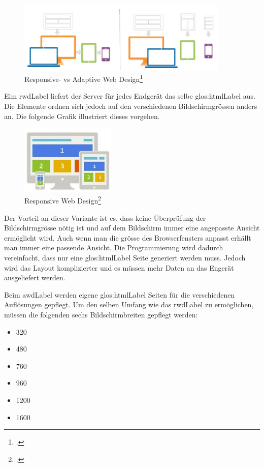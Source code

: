 \begin{figure}[H]
  \centering
  \includegraphics[width=0.9\textwidth]{images/rwd-vs-awd.png}
  \caption{Responsive- vs Adaptive Web Design\footcite{Responsive_vs_Adaptive_Design_for_UI_2015-05-31}}
  \label{fig:requirementsengineerin:endgeraete:responsivevsadaptive:comparision}
\end{figure}

Eim \gls{rwdLabel} liefert der Server für jedes Endgerät das selbe \Gls{glos:htmlLabel} aus. Die Elemente ordnen sich jedoch auf den verschiedenen Bildschirmgrössen anders an. Die folgende Grafik illustriert dieses vorgehen.

\begin{figure}[H]
  \centering
  \includegraphics[width=0.4\textwidth]{images/rwd.jpg}
  \caption{Responsive Web Design\footcite{The_Difference_Between_Adaptive_Design_And_Responsive_Design_2015-05-31}}
  \label{fig:requirementsengineerin:endgeraete:responsivevsadaptive:rwd}
\end{figure}

Der Vorteil an dieser Variante ist es, dass keine Überprüfung der Bildschirmgrösse nötig ist und auf dem Bildschirm immer eine angepasste Ansicht ermöglicht wird. Auch wenn man die grösse des Browserfensters anpasst erhällt man immer eine passende Ansicht. Die Programmierung wird dadurch vereinfacht, dass nur eine \Gls{glos:htmlLabel} Seite generiert werden muss. Jedoch wird das Layout komplizierter und es müssen mehr Daten an das Engerät ausgeliefert werden.

Beim \gls{awdLabel} werden eigene \Gls{glos:htmlLabel} Seiten für die verschiedenen Auflösungen gepflegt. Um den selben Umfang wie das \gls{rwdLabel} zu ermöglichen, müssen die folgenden sechs Bildschirmbreiten gepflegt werden:
\begin{itemize}
\item 320
\item 480
\item 760
\item 960
\item 1200
\item 1600
\end{itemize}

